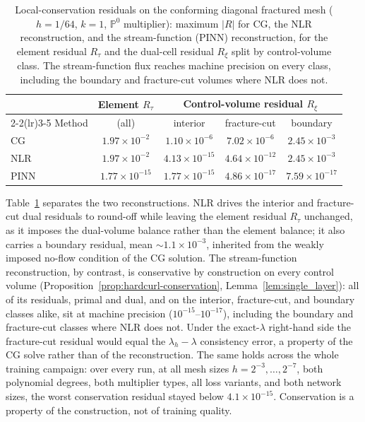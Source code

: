 \documentclass[a4paper,fleqn]{cas-sc}
\begin{document}
\begin{table}[!htbp]
\centering
\caption{Local-conservation residuals on the conforming diagonal fractured mesh
(\(h=1/64\), \(k=1\), \(\mathbb{P}^0\) multiplier): maximum \(|R|\) for CG, the NLR
reconstruction, and the stream-function (PINN) reconstruction, for the element
residual \(R_\tau\) and the dual-cell residual \(R_\xi\) split by control-volume
class. The stream-function flux reaches machine precision on every class,
including the boundary and fracture-cut volumes where NLR does not.}
\label{tab:single_fracture_nlr_results}
\begin{tabular}{lcccc}
\toprule
 & Element \(R_\tau\) & \multicolumn{3}{c}{Control-volume residual \(R_\xi\)} \\
\cmidrule(lr){2-2}\cmidrule(lr){3-5}
Method & (all) & interior & fracture-cut & boundary \\
\midrule
CG   & \(1.97\times10^{-2}\)  & \(1.10\times10^{-6}\)  & \(7.02\times10^{-6}\)  & \(2.45\times10^{-3}\) \\
NLR  & \(1.97\times10^{-2}\)  & \(4.13\times10^{-15}\) & \(4.64\times10^{-12}\) & \(2.45\times10^{-3}\) \\
PINN & \(1.77\times10^{-15}\) & \(1.77\times10^{-15}\) & \(4.86\times10^{-17}\) & \(7.59\times10^{-17}\) \\
\bottomrule
\end{tabular}
\end{table}

Table~\ref{tab:single_fracture_nlr_results} separates the two reconstructions. NLR
drives the interior and fracture-cut dual residuals to round-off while leaving the
element residual \(R_\tau\) unchanged, as it imposes the dual-volume balance rather
than the element balance; it also carries a boundary residual, mean
\(\sim\!1.1\times10^{-3}\), inherited from the weakly imposed no-flow condition of
the CG solution. The stream-function reconstruction, by contrast, is conservative
by construction on every control volume
(Proposition~\ref{prop:hardcurl-conservation}, Lemma~\ref{lem:single_layer}): all
of its residuals, primal and dual, and on the interior, fracture-cut, and boundary
classes alike, sit at machine precision (\(10^{-15}\)--\(10^{-17}\)), including the
boundary and fracture-cut classes where NLR does not. Under the exact-\(\lambda\)
right-hand side the fracture-cut residual would equal the \(\lambda_h-\lambda\)
consistency error, a property of the CG solve rather than of the reconstruction.
The same holds across the whole training campaign: over every run, at all mesh
sizes \(h=2^{-3},\ldots,2^{-7}\), both polynomial degrees, both multiplier types,
all loss variants, and both network sizes, the worst conservation residual stayed
below \(4.1\times10^{-15}\). Conservation is a property of the construction, not of
training quality.
\end{document}
